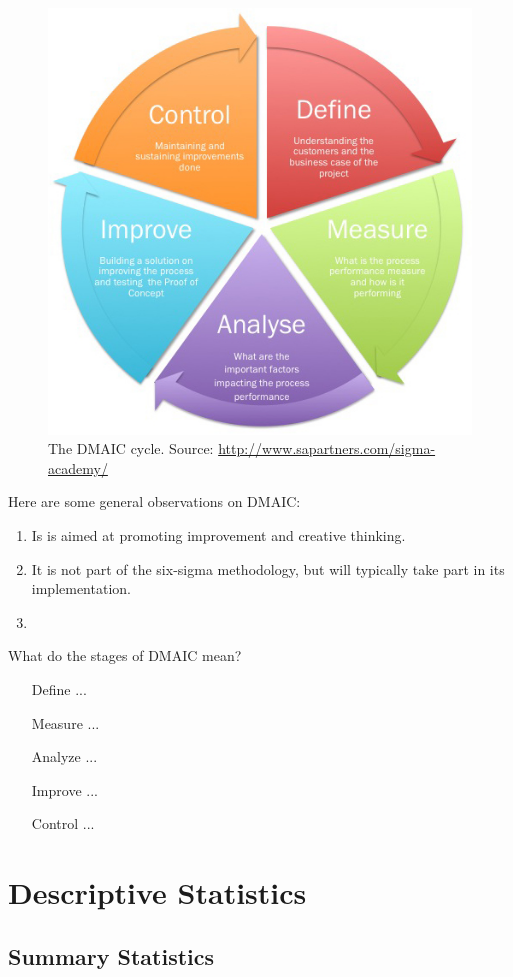 \documentclass[12pt,a4paper]{report}
\begin{document}
\begin{figure}[t]
\centering
\includegraphics[width=0.6\linewidth]{art/Sigma_detail}
\caption[DMAIC]{The DMAIC cycle. Source: \url{http://www.sapartners.com/sigma-academy/}}
\label{fig:DMAIC}
\end{figure}

Here are some general observations on DMAIC:
\begin{enumerate}
\item Is is aimed at promoting improvement and creative thinking.
\item It is not part of the six-sigma methodology, but will typically take part in its implementation.
\item 
\end{enumerate}

What do the stages of DMAIC mean?
\begin{enumerate}
\item [Define] ...
\item [Measure] ...
\item [Analyze]...
\item [Improve] ...
\item [Control] ...
\end{enumerate}



\chapter{Descriptive Statistics}

\section{Summary Statistics}
\end{document}
